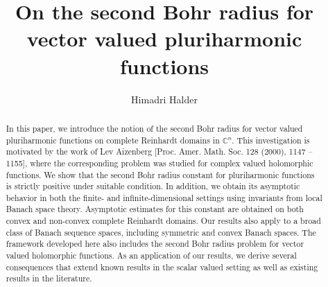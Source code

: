 \documentclass[a4paper,11pt, reqno]{amsart}
\theoremstyle{definition}
\newcounter{minutes}\setcounter{minutes}{\time}
\newcounter{hours}\setcounter{hours}{\time}
\newcounter {own}
\begin{document}
	
	\title[]{On the second Bohr radius for vector valued pluriharmonic functions}
	
	
	
	
	\author{Himadri Halder}
	\address{Himadri Halder,
		Department of Mathematics,
		Indian Institute of Science, Bangalore-560012, India}
	
	
	
	
	
	
	
	
	\begin{abstract}
		In this paper, we introduce the notion of the second Bohr radius for vector valued pluriharmonic functions on complete Reinhardt domains in $\mathbb{C}^n$. This investigation is motivated by the work of
		Lev Aizenberg [Proc. Amer. Math. Soc. 128 (2000), 1147  –1155], where the corresponding problem was studied for complex valued holomorphic functions. We show that the second Bohr radius constant for pluriharmonic functions is strictly positive under suitable condition. In addition, we obtain its asymptotic behavior in both the finite- and infinite-dimensional settings using invariants from local Banach space theory. Asymptotic estimates for this constant are obtained on both convex and non-convex complete Reinhardt domains. Our results also apply to a broad class of Banach sequence spaces, including symmetric and convex Banach spaces. The framework developed here also includes the second Bohr radius problem for vector valued holomorphic functions. As an application of our results, we derive several consequences that extend known results in the scalar valued setting as well as existing results in the literature.
	\end{abstract}
	
	
	
	\maketitle
	\pagestyle{myheadings}
	\tableofcontents
\end{document}
